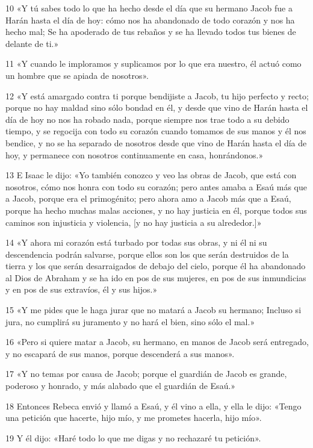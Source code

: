 \par 10 «Y tú sabes todo lo que ha hecho desde el día que su hermano Jacob fue a Harán hasta el día de hoy: cómo nos ha abandonado de todo corazón y nos ha hecho mal; Se ha apoderado de tus rebaños y se ha llevado todos tus bienes de delante de ti.»
\par 11 «Y cuando le imploramos y suplicamos por lo que era nuestro, él actuó como un hombre que se apiada de nosotros».
\par 12 «Y está amargado contra ti porque bendijiste a Jacob, tu hijo perfecto y recto; porque no hay maldad sino sólo bondad en él, y desde que vino de Harán hasta el día de hoy no nos ha robado nada, porque siempre nos trae todo a su debido tiempo, y se regocija con todo su corazón cuando tomamos de sus manos y él nos bendice, y no se ha separado de nosotros desde que vino de Harán hasta el día de hoy, y permanece con nosotros continuamente en casa, honrándonos.»
\par 13 E Isaac le dijo: «Yo también conozco y veo las obras de Jacob, que está con nosotros, cómo nos honra con todo su corazón; pero antes amaba a Esaú más que a Jacob, porque era el primogénito; pero ahora amo a Jacob más que a Esaú, porque ha hecho muchas malas acciones, y no hay justicia en él, porque todos sus caminos son injusticia y violencia, [y no hay justicia a su alrededor.]»
\par 14 «Y ahora mi corazón está turbado por todas sus obras, y ni él ni su descendencia podrán salvarse, porque ellos son los que serán destruidos de la tierra y los que serán desarraigados de debajo del cielo, porque él ha abandonado al Dios de Abraham y se ha ido en pos de sus mujeres, en pos de sus inmundicias y en pos de sus extravíos, él y sus hijos.»
\par 15 «Y me pides que le haga jurar que no matará a Jacob su hermano; Incluso si jura, no cumplirá su juramento y no hará el bien, sino sólo el mal.»
\par 16 «Pero si quiere matar a Jacob, su hermano, en manos de Jacob será entregado, y no escapará de sus manos, porque descenderá a sus manos».
\par 17 «Y no temas por causa de Jacob; porque el guardián de Jacob es grande, poderoso y honrado, y más alabado que el guardián de Esaú.»
\par 18 Entonces Rebeca envió y llamó a Esaú, y él vino a ella, y ella le dijo: «Tengo una petición que hacerte, hijo mío, y me prometes hacerla, hijo mío».
\par 19 Y él dijo: «Haré todo lo que me digas y no rechazaré tu petición».
